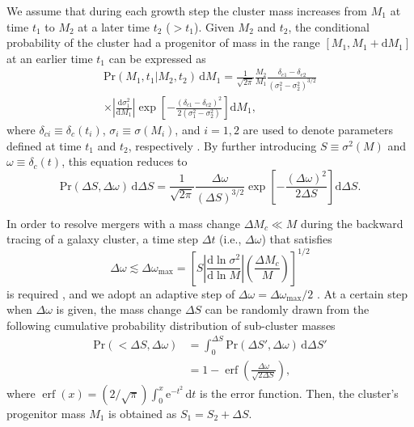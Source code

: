 \documentclass[twocolumn]{aastex62}
\newcommand{\R}[1]{\mathrm{#1}}
\newcommand{\D}[1]{\R{d} #1}
\newcommand{\diff}[2]{\frac{\D{#1}}{\D{#2}}}
\DeclareMathOperator{\erf}{erf}
\begin{document}
We assume that during each growth step the cluster mass increases
from $M_1$ at time $t_1$ to $M_2$ at a later time $t_2$ ($> t_1$).
Given $M_2$ and $t_2$, the conditional probability of the cluster had
a progenitor of mass in the range $[M_1, M_1 + \D{M_1}]$ at an earlier
time $t_1$ can be expressed as
\begin{multline}
  \label{eq:eps-condprob}
  \R{Pr}(M_1, t_1 | M_2, t_2) \,\D{M_1} =
    \frac{1}{\sqrt{2\pi}} \frac{M_2}{M_1}
    \frac{\delta_{c1} - \delta_{c2}}{(\sigma_1^2 - \sigma_2^2)^{3/2}} \\
    \times \left| \diff{\sigma_1^2}{M_1} \right|
    \exp \!\left[ -\frac{(\delta_{c1} - \delta_{c2})^2}
      {2(\sigma_1^2 - \sigma_2^2)} \right] \D{M_1},
\end{multline}
where
$\delta_{ci} \equiv \delta_c(t_i)$, $\sigma_i \equiv \sigma(M_i)$, and
$i = 1, 2$ are used to denote parameters defined at time $t_1$ and $t_2$,
respectively \citep{lacey1993,randall2002}.
By further introducing $S \equiv \sigma^2(M)$ and
$\omega \equiv \delta_c(t)$, this equation reduces to
\begin{equation}
  \label{eq:eps-condprob-simp}
  \R{Pr}(\Delta S, \Delta \omega) \,\D{\Delta S} = \frac{1}{\sqrt{2\pi}}
  \frac{\Delta\omega}{(\Delta S)^{3/2}}
  \exp \!\left[ -\frac{(\Delta\omega)^2}{2 \Delta S} \right] \D{\Delta S}.
\end{equation}

In order to resolve mergers with a mass change $\Delta M_c \ll M$
during the backward tracing of a galaxy cluster, a time step $\Delta t$
(i.e., $\Delta\omega$) that satisfies
\begin{equation}
  \label{sec:dw-step}
  \Delta\omega \lesssim \Delta\omega_{\R{max}} = \left[
    S \left| \diff{\ln \sigma^2}{\ln M} \right|
    \left( \frac{\Delta M_c}{M} \right) \right]^{1/2}
\end{equation}
is required \citep{lacey1993}, and we adopt an adaptive step of
$\Delta\omega = \Delta\omega_{\R{max}} / 2$ \citep{randall2002}.
At a certain step when $\Delta\omega$ is given, the mass change
$\Delta S$ can be randomly drawn from the following cumulative
probability distribution of sub-cluster masses
\begin{align}
  \label{sec:cdf-sub-masses}
  \R{Pr}(<\!\Delta S, \Delta\omega)
    & = \int_0^{\Delta S} \R{Pr}(\Delta S', \Delta\omega) \,\D{\Delta S'} \\
    & = 1 - \erf \!\left( \frac{\Delta \omega}{\sqrt{2 \Delta S}} \right),
\end{align}
where
$\erf(x) = (2/\sqrt{\pi}) \int_0^x \R{e}^{-t^2} \,\D{t}$
is the error function.
Then, the cluster's progenitor mass $M_1$ is obtained as
$S_1 = S_2 + \Delta S$.
\end{document}
